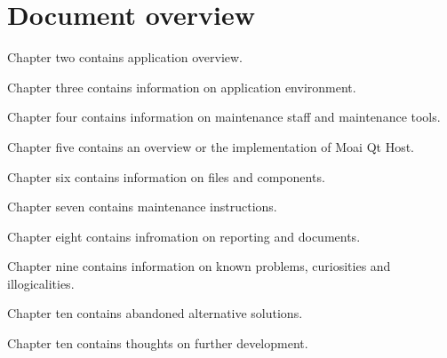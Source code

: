 \section {Document overview}

Chapter two contains application overview.

Chapter three contains information on application environment.

Chapter four contains information on maintenance staff and maintenance tools.

Chapter five contains an overview or the implementation of Moai Qt Host.

Chapter six contains information on files and components.

Chapter seven contains maintenance instructions.

Chapter eight contains infromation on reporting and documents.

Chapter nine contains information on known problems, curiosities and illogicalities.

Chapter ten contains abandoned alternative solutions.

Chapter ten contains thoughts on further development.
